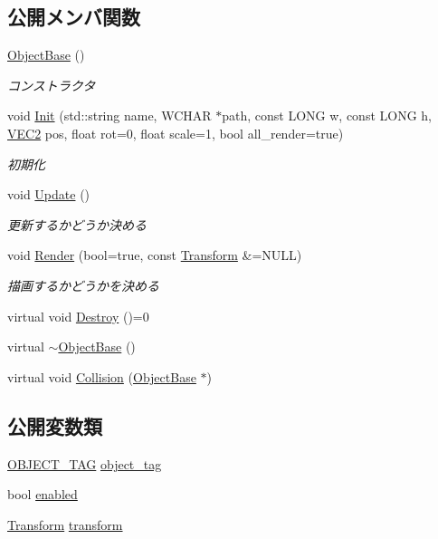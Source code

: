 \subsection*{公開メンバ関数}
\begin{DoxyCompactItemize}
\item 
\mbox{\hyperlink{class_object_base_af2c3a18da2d1cd1c0dd5fae168207f0c}{Object\+Base}} ()
\begin{DoxyCompactList}\small\item\em コンストラクタ \end{DoxyCompactList}\item 
void \mbox{\hyperlink{class_object_base_aea82aedc489b0a9d9990aafa06eef514}{Init}} (std\+::string name, W\+C\+H\+AR $\ast$path, const L\+O\+NG w, const L\+O\+NG h, \mbox{\hyperlink{transform_8h_afb0c5e21d4133ff4f200992c0b534e1b}{V\+E\+C2}} pos, float rot=0, float scale=1, bool all\+\_\+render=true)
\begin{DoxyCompactList}\small\item\em 初期化 \end{DoxyCompactList}\item 
void \mbox{\hyperlink{class_object_base_a5b5672034139b22235ada326eb16dd3e}{Update}} ()
\begin{DoxyCompactList}\small\item\em 更新するかどうか決める \end{DoxyCompactList}\item 
void \mbox{\hyperlink{class_object_base_ac84be5b56d23b8809ca08e27c0dcb16a}{Render}} (bool=true, const \mbox{\hyperlink{class_transform}{Transform}} \&=N\+U\+LL)
\begin{DoxyCompactList}\small\item\em 描画するかどうかを決める \end{DoxyCompactList}\item 
virtual void \mbox{\hyperlink{class_object_base_a7fa4c548153c3af20f89673ffea809af}{Destroy}} ()=0
\item 
virtual \mbox{\hyperlink{class_object_base_a7074bc9389069351c2d0eee6a47e5ee3}{$\sim$\+Object\+Base}} ()
\item 
virtual void \mbox{\hyperlink{class_object_base_a1991d1c2c214a593feb6b6b24802a8c4}{Collision}} (\mbox{\hyperlink{class_object_base}{Object\+Base}} $\ast$)
\end{DoxyCompactItemize}
\subsection*{公開変数類}
\begin{DoxyCompactItemize}
\item 
\mbox{\hyperlink{object__base_8h_a0eff9883ab049ee02773dde19d057c0c}{O\+B\+J\+E\+C\+T\+\_\+\+T\+AG}} \mbox{\hyperlink{class_object_base_aff7eb5482ca9bc1cd30b84994d0dad8b}{object\+\_\+tag}}
\item 
bool \mbox{\hyperlink{class_object_base_ade1c868f20653a6fa5236544120eca2b}{enabled}}
\item 
\mbox{\hyperlink{class_transform}{Transform}} \mbox{\hyperlink{class_object_base_ac8096c26fe09682da6119208d392dc62}{transform}}
\end{DoxyCompactItemize}
